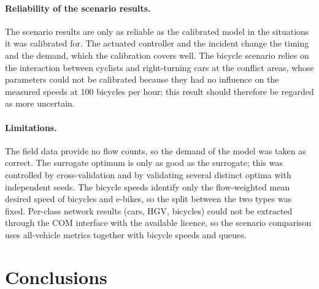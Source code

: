 \documentclass[11pt,a4paper]{article}
\begin{document}
\paragraph{Reliability of the scenario results.} The scenario results are only as reliable as the
calibrated model in the situations it was calibrated for. The actuated controller and the incident
change the timing and the demand, which the calibration covers well. The bicycle scenario relies on
the interaction between cyclists and right-turning cars at the conflict areas, whose parameters
could not be calibrated because they had no influence on the measured speeds at 100 bicycles per
hour; this result should therefore be regarded as more uncertain.

\paragraph{Limitations.} The field data provide no flow counts, so the demand of the model was taken
as correct. The surrogate optimum is only as good as the surrogate; this was controlled by
cross-validation and by validating several distinct optima with independent seeds. The bicycle
speeds identify only the flow-weighted mean desired speed of bicycles and e-bikes, so the split
between the two types was fixed. Per-class network results (cars, HGV, bicycles) could not be
extracted through the COM interface with the available licence, so the scenario comparison uses
all-vehicle metrics together with bicycle speeds and queues.

\section{Conclusions}
\label{sec:conclusions}
\end{document}

